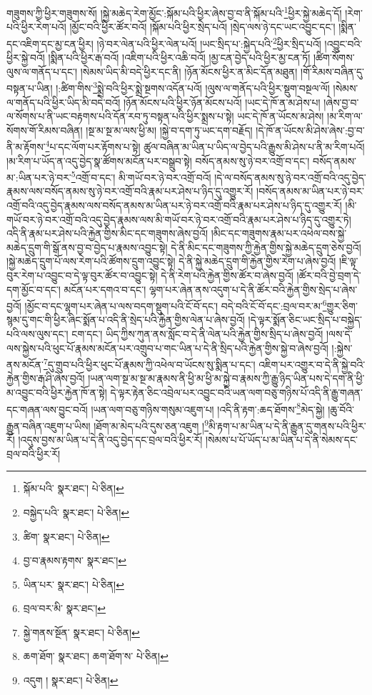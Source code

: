 གཟུགས་ཀྱི་ཕྱིར་གཟུགས་སོ། །སྐྱེ་མཆེད་རེག་མྱོང་:སྐོམ་པའི་ཕྱིར་ཞེས་བྱ་བ་ནི་སྐོམ་པའི་\footnote{སྐོམ་པའི་  སྣར་ཐང་།  པེ་ཅིན། }ཕྱིར་སྐྱེ་མཆེད་དོ། །རེག་པའི་ཕྱིར་རེག་པའོ། །མྱོང་བའི་ཕྱིར་ཚོར་བའོ། །སྐོམ་པའི་ཕྱིར་སྲེད་པའོ། །སྲེད་ལས་ཉེ་དང་ཡང་འབྱུང་དང་། །སྨིན་དང་འཇིག་དང་མྱ་ངན་ཕྱིར། །ཉེ་བར་ལེན་པའི་ཕྱིར་ལེན་པའོ། །ཡང་སྲིད་པ་:སྐྱེད་པའི་\footnote{བསྐྱེད་པའི་  སྣར་ཐང་།  པེ་ཅིན། }ཕྱིར་སྲིད་པའོ། །འབྱུང་བའི་ཕྱིར་སྐྱེ་བའོ། །སྨིན་པའི་ཕྱིར་རྒ་བའོ། །འཇིག་པའི་ཕྱིར་འཆི་བའོ། །མྱ་ངན་བྱེད་པའི་ཕྱིར་མྱ་ངན་ཏོ། །ཚིག་སོགས་ལུས་ལ་གནོད་པ་དང་། །སེམས་ཡིད་མི་བདེ་ཕྱིར་དང་ནི། །ཉོན་མོངས་ཕྱིར་ན་མིང་དོན་མཐུན། །གོ་རིམས་བཞིན་དུ་བསྟན་པ་ཡིན། །:ཚིག་གིས་\footnote{ཚིག་  སྣར་ཐང་།  པེ་ཅིན། }སྨྲེ་བའི་ཕྱིར་སྨྲེ་སྔགས་འདོན་པའོ། །ལུས་ལ་གནོད་པའི་ཕྱིར་སྡུག་བསྔལ་ལོ། །སེམས་ལ་གནོད་པའི་ཕྱིར་ཡིད་མི་བདེ་བའོ། །ཉོན་མོངས་པའི་ཕྱིར་ཉོན་མོངས་པའོ། །ཡང་དེ་ཁོ་ན་མ་ཤེས་པ། །ཞེས་བྱ་བ་ལ་སོགས་པ་ནི་ཡང་བརྟགས་པའི་དོན་རབ་ཏུ་བསྟན་པའི་ཕྱིར་སྨྲས་པ་སྟེ། ཡང་དེ་ཁོ་ན་ཡོངས་མ་ཤེས། །མ་རིག་ལ་སོགས་གོ་རིམས་བཞིན། །སྔ་མ་སྔ་མ་ལས་ཕྱི་མ། །སྐྱེ་བ་དག་ཏུ་ཡང་དག་བརྗོད། །དེ་ཁོ་ན་ཡོངས་མི་ཤེས་ཞེས་:བྱ་བ་ནི་མ་རྟོགས་\footnote{བྱ་བ་རྣམས་རྟགས་  སྣར་ཐང་། }པ་དང་ལོག་པར་རྟོགས་པ་སྟེ། ཚུལ་བཞིན་མ་ཡིན་པ་ཡིད་ལ་བྱེད་པའི་རྒྱུས་མི་ཤེས་པ་ནི་མ་རིག་པའོ། །མ་རིག་པ་ཡོད་ན་འདུ་བྱེད་སྣ་ཚོགས་མངོན་པར་བསྒྲུབ་སྟེ། བསོད་ནམས་སུ་ཉེ་བར་འགྲོ་བ་དང་། བསོད་ནམས་མ་:ཡིན་པར་ཉེ་བར་\footnote{ཡིན་པར་  སྣར་ཐང་།  པེ་ཅིན། }འགྲོ་བ་དང་། མི་གཡོ་བར་ཉེ་བར་འགྲོ་བའོ། །དེ་ལ་བསོད་ནམས་སུ་ཉེ་བར་འགྲོ་བའི་འདུ་བྱེད་རྣམས་ལས་བསོད་ནམས་སུ་ཉེ་བར་འགྲོ་བའི་རྣམ་པར་ཤེས་པ་ཉིད་དུ་འགྱུར་རོ། །བསོད་ནམས་མ་ཡིན་པར་ཉེ་བར་འགྲོ་བའི་འདུ་བྱེད་རྣམས་ལས་བསོད་ནམས་མ་ཡིན་པར་ཉེ་བར་འགྲོ་བའི་རྣམ་པར་ཤེས་པ་ཉིད་དུ་འགྱུར་རོ། །མི་གཡོ་བར་ཉེ་བར་འགྲོ་བའི་འདུ་བྱེད་རྣམས་ལས་མི་གཡོ་བར་ཉེ་བར་འགྲོ་བའི་རྣམ་པར་ཤེས་པ་ཉིད་དུ་འགྱུར་ཏེ། འདི་ནི་རྣམ་པར་ཤེས་པའི་རྐྱེན་གྱིས་མིང་དང་གཟུགས་ཞེས་བྱའོ། །མིང་དང་གཟུགས་རྣམ་པར་འཕེལ་བས་སྐྱེ་མཆེད་དྲུག་གི་སྒོ་ནས་བྱ་བ་བྱེད་པ་རྣམས་འབྱུང་སྟེ། དེ་ནི་མིང་དང་གཟུགས་ཀྱི་རྐྱེན་གྱིས་སྐྱེ་མཆེད་དྲུག་ཅེས་བྱའོ། །སྐྱེ་མཆེད་དྲུག་པོ་ལས་རེག་པའི་ཚོགས་དྲུག་འབྱུང་སྟེ། དེ་ནི་སྐྱེ་མཆེད་དྲུག་གི་རྐྱེན་གྱིས་རེག་པ་ཞེས་བྱའོ། །ཇི་ལྟ་བུར་རེག་པ་འབྱུང་བ་དེ་ལྟ་བུར་ཚོར་བ་འབྱུང་སྟེ། དེ་ནི་རེག་པའི་རྐྱེན་གྱིས་ཚོར་བ་ཞེས་བྱའོ། །ཚོར་བའི་བྱེ་བྲག་དེ་དག་མྱོང་བ་དང་། མངོན་པར་དགའ་བ་དང་། ལྷག་པར་ཞེན་ནས་འདུག་པ་དེ་ནི་ཚོར་བའི་རྐྱེན་གྱིས་སྲེད་པ་ཞེས་བྱའོ། །མྱོང་བ་དང་ལྷག་པར་ཞེན་པ་ལས་བདག་སྡུག་པའི་ངོ་བོ་དང་། བདེ་བའི་ངོ་བོ་དང་:བྲལ་བར་མ་\footnote{བྲལ་བར་མི་  སྣར་ཐང་། }གྱུར་ཅིག་སྙམ་དུ་གང་གི་ཕྱིར་ཞིང་སྨོན་པ་འདི་ནི་སྲེད་པའི་རྐྱེན་གྱིས་ལེན་པ་ཞེས་བྱའོ། །དེ་ལྟར་སྨོན་ཅིང་ཡང་སྲིད་པ་བསྐྱེད་པའི་ལས་ལུས་དང་། ངག་དང་། ཡིད་ཀྱིས་ཀུན་ནས་སློང་བ་དེ་ནི་ལེན་པའི་རྐྱེན་གྱིས་སྲིད་པ་ཞེས་བྱའོ། །ལས་དེ་ལས་སྐྱེས་པའི་ཕུང་པོ་རྣམས་མངོན་པར་འགྲུབ་པ་གང་ཡིན་པ་དེ་ནི་སྲིད་པའི་རྐྱེན་གྱིས་སྐྱེ་བ་ཞེས་བྱའོ། །:སྐྱེས་ནས་མངོན་\footnote{སྐྱེ་གནས་སྔོན་  སྣར་ཐང་།  པེ་ཅིན། }དུ་གྲུབ་པའི་ཕྱིར་ཕུང་པོ་རྣམས་ཀྱི་འཕེལ་བ་ཡོངས་སུ་སྨིན་པ་དང་། འཇིག་པར་འགྱུར་བ་དེ་ནི་སྐྱེ་བའི་རྐྱེན་གྱིས་རྒ་ཤི་ཞེས་བྱའོ། །ཡན་ལག་སྔ་མ་སྔ་མ་རྣམས་ནི་ཕྱི་མ་ཕྱི་མ་སྐྱེ་བ་རྣམས་ཀྱི་རྒྱུ་ཉིད་ཡིན་པས་དེ་དག་ནི་ཕྱི་མ་འབྱུང་བའི་ཕྱིར་རྐྱེན་ཁོ་ན་སྟེ། དེ་ལྟར་རྟེན་ཅིང་འབྲེལ་པར་འབྱུང་བའི་ཡན་ལག་བཅུ་གཉིས་པོ་འདི་ནི་རྒྱུ་གཞན་དང་གཞན་ལས་བྱུང་བའོ། །ཡན་ལག་བཅུ་གཉིས་གསུམ་འཇུག་པ། །འདི་ནི་རྟག་:ཆད་ཐོགས་\footnote{ཆག་ཐོག་  སྣར་ཐང་། ཆག་ཐོག་ས་  པེ་ཅིན། }མེད་སྐྱེ། །ཆུ་བོའི་རྒྱུན་བཞིན་འཇུག་པ་ཡིས། །ཐོག་མ་མེད་པའི་དུས་ཅན་འཇུག །\footnote{འདུག །  སྣར་ཐང་།  པེ་ཅིན། }མི་རྟག་པ་མ་ཡིན་པ་དེ་ནི་རྒྱུན་དུ་གནས་པའི་ཕྱིར་རོ། །འདུས་བྱས་མ་ཡིན་པ་དེ་ནི་འདུ་བྱེད་དང་བྲལ་བའི་ཕྱིར་རོ། །སེམས་པ་པོ་ཡོད་པ་མ་ཡིན་པ་དེ་ནི་སེམས་དང་བྲལ་བའི་ཕྱིར་རོ། 